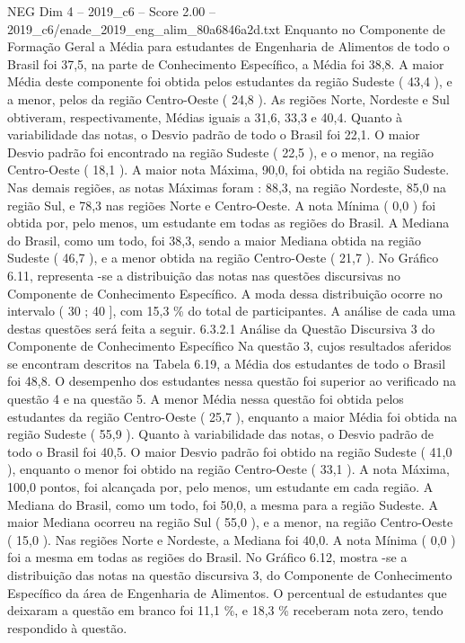 \begin{textsample}{NEG Dim 4 – 2019\_c6 – Score 2.00 – 2019\_c6/enade\_2019\_eng\_alim\_80a6846a2d.txt}
Enquanto no Componente de Formação Geral a Média para estudantes de Engenharia de Alimentos de todo o Brasil foi 37,5, na parte de Conhecimento Específico, a Média foi 38,8.
A maior Média deste componente foi obtida pelos estudantes da região Sudeste ( 43,4 ), e a menor, pelos da região Centro-Oeste ( 24,8 ).
As regiões Norte, Nordeste e Sul obtiveram, respectivamente, Médias iguais a 31,6, 33,3 e 40,4.
Quanto à variabilidade das notas, o Desvio padrão de todo o Brasil foi 22,1.
O maior Desvio padrão foi encontrado na região Sudeste ( 22,5 ), e o menor, na região Centro-Oeste ( 18,1 ).
A maior nota Máxima, 90,0, foi obtida na região Sudeste.
Nas demais regiões, as notas Máximas foram : 88,3, na região Nordeste, 85,0 na região Sul, e 78,3 nas regiões Norte e Centro-Oeste.
A nota Mínima ( 0,0 ) foi obtida por, pelo menos, um estudante em todas as regiões do Brasil.
A Mediana do Brasil, como um todo, foi 38,3, sendo a maior Mediana obtida na região Sudeste ( 46,7 ), e a menor obtida na região Centro-Oeste ( 21,7 ).
No Gráfico 6.11, representa -se a distribuição das notas nas questões discursivas no Componente de Conhecimento Específico.
A moda dessa distribuição ocorre no intervalo ( 30 ; 40 ], com 15,3 \% do total de participantes.
A análise de cada uma destas questões será feita a seguir. 6.3.2.1 Análise da Questão Discursiva 3 do Componente de Conhecimento Específico Na questão 3, cujos resultados aferidos se encontram descritos na Tabela 6.19, a Média dos estudantes de todo o Brasil foi 48,8.
O desempenho dos estudantes nessa questão foi superior ao verificado na questão 4 e na questão 5.
A menor Média nessa questão foi obtida pelos estudantes da região Centro-Oeste ( 25,7 ), enquanto a maior Média foi obtida na região Sudeste ( 55,9 ).
Quanto à variabilidade das notas, o Desvio padrão de todo o Brasil foi 40,5.
O maior Desvio padrão foi obtido na região Sudeste ( 41,0 ), enquanto o menor foi obtido na região Centro-Oeste ( 33,1 ).
A nota Máxima, 100,0 pontos, foi alcançada por, pelo menos, um estudante em cada região.
A Mediana do Brasil, como um todo, foi 50,0, a mesma para a região Sudeste.
A maior Mediana ocorreu na região Sul ( 55,0 ), e a menor, na região Centro-Oeste ( 15,0 ).
Nas regiões Norte e Nordeste, a Mediana foi 40,0.
A nota Mínima ( 0,0 ) foi a mesma em todas as regiões do Brasil.
No Gráfico 6.12, mostra -se a distribuição das notas na questão discursiva 3, do Componente de Conhecimento Específico da área de Engenharia de Alimentos.
O percentual de estudantes que deixaram a questão em branco foi 11,1 \%, e 18,3 \% receberam nota zero, tendo respondido à questão.

\end{textsample}
